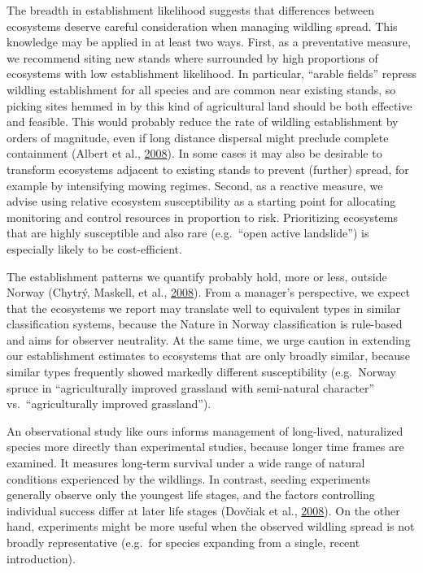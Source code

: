 \documentclass[
]{article}
\begin{document}
The breadth in establishment likelihood suggests that differences between ecosystems deserve careful consideration when managing wildling spread.
This knowledge may be applied in at least two ways.
First, as a preventative measure, we recommend siting new stands where surrounded by high proportions of ecosystems with low establishment likelihood.
In particular, ``arable fields'' repress wildling establishment for all species and are common near existing stands, so picking sites hemmed in by this kind of agricultural land should be both effective and feasible.
This would probably reduce the rate of wildling establishment by orders of magnitude, even if long distance dispersal might preclude complete containment (Albert et al., \protect\hyperlink{ref-albertLanduseChangeSubalpine2008}{2008}).
In some cases it may also be desirable to transform ecosystems adjacent to existing stands to prevent (further) spread, for example by intensifying mowing regimes.
Second, as a reactive measure, we advise using relative ecosystem susceptibility as a starting point for allocating monitoring and control resources in proportion to risk.
Prioritizing ecosystems that are highly susceptible and also rare (e.g.~``open active landslide'') is especially likely to be cost-efficient.

The establishment patterns we quantify probably hold, more or less, outside Norway (Chytrý, Maskell, et al., \protect\hyperlink{ref-chytryHabitatInvasionsAlien2008}{2008}).
From a manager's perspective, we expect that the ecosystems we report may translate well to equivalent types in similar classification systems, because the Nature in Norway classification is rule-based and aims for observer neutrality.
At the same time, we urge caution in extending our establishment estimates to ecosystems that are only broadly similar, because similar types frequently showed markedly different susceptibility (e.g.~Norway spruce in ``agriculturally improved grassland with semi-natural character'' vs.~``agriculturally improved grassland'').

An observational study like ours informs management of long-lived, naturalized species more directly than experimental studies, because longer time frames are examined.
It measures long-term survival under a wide range of natural conditions experienced by the wildlings.
In contrast, seeding experiments generally observe only the youngest life stages, and the factors controlling individual success differ at later life stages (Dovčiak et al., \protect\hyperlink{ref-dovciakSeedRainEnvironmental2008}{2008}).
On the other hand, experiments might be more useful when the observed wildling spread is not broadly representative (e.g.~for species expanding from a single, recent introduction).
\end{document}
